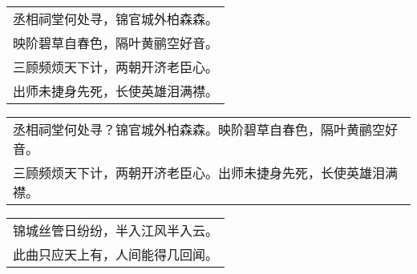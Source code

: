 \nopagebreak%
\nopagebreak%
\noindent\begin{minipage}{\linewidth}
  \vskip-3pt\begin{table}[H]
    \centering
    \begin{tabular}{@{}l@{}}
丞相祠堂何处寻，锦官城外柏森森。\\
映阶碧草自春色，隔叶黄鹂空好音。\\
三顾频烦天下计，两朝开济老臣心。\\
出师未捷身先死，长使英雄泪满襟。
    \end{tabular}
  \end{table}
\end{minipage}
\vspace{1cm}


\nopagebreak%
\nopagebreak%
\noindent\begin{minipage}{\linewidth}
  \vskip-3pt\begin{table}[H]
    \centering
    \begin{tabular}{@{}l@{}}
丞相祠堂何处寻？锦官城外柏森森。映阶碧草自春色，隔叶黄鹂空好音。\\
三顾频烦天下计，两朝开济老臣心。出师未捷身先死，长使英雄泪满襟。
    \end{tabular}
  \end{table}
\end{minipage}
\vspace{1cm}


\nopagebreak%
\nopagebreak%
\noindent\begin{minipage}{\linewidth}
  \vskip-3pt\begin{table}[H]
    \centering
    \begin{tabular}{@{}l@{}}
锦城丝管日纷纷，半入江风半入云。\\
此曲只应天上有，人间能得几回闻。
    \end{tabular}
  \end{table}
\end{minipage}
\vspace{1cm}


